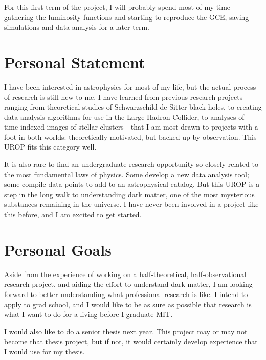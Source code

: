 \documentclass[11pt]{article}
\begin{document}
For this first term of the project, I will probably spend most of my time gathering the luminosity functions and starting to reproduce the GCE, saving simulations and data analysis for a later term.


\section{Personal Statement}
I have been interested in astrophysics for most of my life, but the actual process of research is still new to me. I have learned from previous research projects---ranging from theoretical studies of Schwarzschild de Sitter black holes, to creating data analysis algorithms for use in the Large Hadron Collider, to analyses of time-indexed images of stellar clusters---that I am most drawn to projects with a foot in both worlds: theoretically-motivated, but backed up by observation. This UROP fits this category well.

It is also rare to find an undergraduate research opportunity so closely related to the most fundamental laws of physics. Some develop a new data analysis tool; some compile data points to add to an astrophysical catalog. But this UROP is a step in the long walk to understanding dark matter, one of the most mysterious substances remaining in the universe. I have never been involved in a project like this before, and I am excited to get started.

\section{Personal Goals}
Aside from the experience of working on a half-theoretical, half-observational research project, and aiding the effort to understand dark matter, I am looking forward to better understanding what professional research is like. I intend to apply to grad school, and I would like to be as sure as possible that research is what I want to do for a living before I graduate MIT.

I would also like to do a senior thesis next year. This project may or may not become that thesis project, but if not, it would certainly develop experience that I would use for my thesis.
\end{document}
